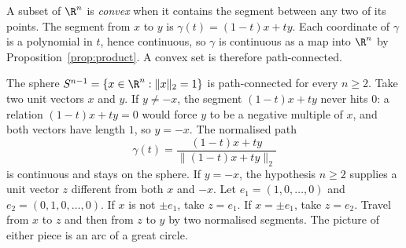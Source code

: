 A subset of $\R^n$ is \emph{convex} when it contains the segment between any two of its points. The segment from $x$ to $y$ is $\gamma(t)=(1-t)x+ty$. Each coordinate of $\gamma$ is a polynomial in $t$, hence continuous, so $\gamma$ is continuous as a map into $\R^n$ by Proposition~\ref{prop:product}. A convex set is therefore path-connected.

The sphere $S^{n-1}=\{x\in\R^n:\|x\|_2=1\}$ is path-connected for every $n\ge2$. Take two unit vectors $x$ and $y$. If $y\ne -x$, the segment $(1-t)x+ty$ never hits $0$: a relation $(1-t)x+ty=0$ would force $y$ to be a negative multiple of $x$, and both vectors have length $1$, so $y=-x$. The normalised path
\[
\gamma(t)=\frac{(1-t)x+ty}{\|(1-t)x+ty\|_2}
\]
is continuous and stays on the sphere. If $y=-x$, the hypothesis $n\ge2$ supplies a unit vector $z$ different from both $x$ and $-x$. Let $e_1=(1,0,\dots,0)$ and $e_2=(0,1,0,\dots,0)$. If $x$ is not $\pm e_1$, take $z=e_1$. If $x=\pm e_1$, take $z=e_2$. Travel from $x$ to $z$ and then from $z$ to $y$ by two normalised segments. The picture of either piece is an arc of a great circle.

